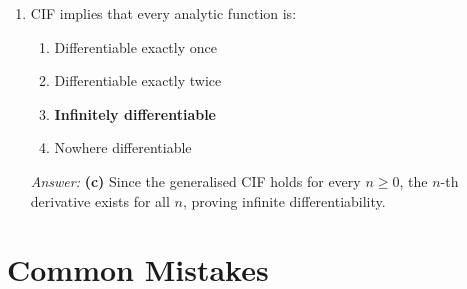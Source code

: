 \documentclass[12pt,a4paper]{article}
\begin{document}
\begin{enumerate}[label=\textbf{MCQ \arabic*.}, leftmargin=*]
  \item CIF implies that every analytic function is:
  \begin{enumerate}[label=(\alph*)]
    \item Differentiable exactly once
    \item Differentiable exactly twice
    \item \textbf{Infinitely differentiable}
    \item Nowhere differentiable
  \end{enumerate}
  \textit{Answer:} \textbf{(c)} Since the generalised CIF holds for every $n \geq 0$,
  the $n$-th derivative exists for all $n$, proving infinite differentiability.

\end{enumerate}

\section{Common Mistakes}
\end{document}
